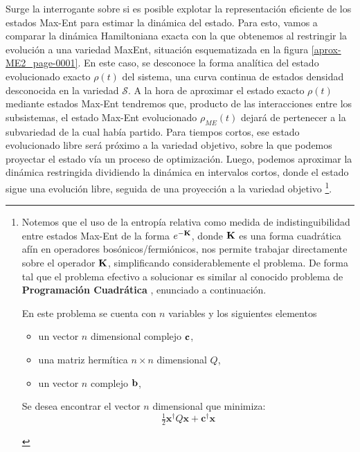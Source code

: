 \documentclass{report} %
\numberwithin{equation}{section}
\begin{document}
Surge la interrogante sobre si es posible explotar la representación eficiente de los estados Max-Ent para estimar la dinámica del estado. Para esto, vamos a comparar  la dinámica Hamiltoniana exacta con la que obtenemos al restringir la evolución a una variedad MaxEnt, situación esquematizada en la figura \ref{aprox-ME2_page-0001}. En este caso, se desconoce la forma analítica del estado evolucionado exacto $\rho(t)$ del sistema, una curva continua de estados densidad desconocida en la variedad $\mathcal{S}$. A la hora de aproximar el estado exacto $\rho(t)$ mediante estados Max-Ent tendremos que, producto de las interacciones entre los subsistemas, el estado Max-Ent evolucionado $\rho_{ME}(t)$  dejará de pertenecer a la subvariedad de la cual había partido. Para tiempos cortos, ese estado evolucionado libre será próximo a la variedad objetivo, sobre la que podemos proyectar el estado vía un proceso de optimización. Luego, podemos aproximar la dinámica restringida dividiendo la dinámica en intervalos cortos, donde el estado sigue una evolución libre, seguida de una proyección a la variedad objetivo \footnote{Notemos que el uso de la entropía relativa como medida de indistinguibilidad entre estados Max-Ent de la forma $e^{-{\bf K} }$, donde ${\bf K}$ es una forma cuadrática afín en operadores bosónicos/fermiónicos, nos permite trabajar directamente sobre el operador ${\bf K}$, simplificando considerablemente el problema. De forma tal que el problema efectivo a solucionar es similar al conocido problema de \textbf{Programación Cuadrática} \cite{NoceWrig06}, enunciado a continuación.  

\begin{tcolorbox}[colback=red!5!white, colframe=red!50!black, title= Problema de Programación Cuadrática Generalizado ]

En este problema se cuenta con $n$ variables y los siguientes elementos

\begin{itemize}
    \item un vector $n$ dimensional complejo ${\bf c}$,
    \item una matriz hermítica $n \times n$ dimensional $Q$,
    \item un vector $n$ complejo ${\bf b}$,
\end{itemize}

Se desea encontrar el vector $n$ dimensional que minimiza: 
$$
{\displaystyle {\tfrac {1}{2}}\mathbf {x} ^{\dagger }Q\mathbf {x} +\mathbf {c} ^{\dagger }\mathbf {x} }
$$
\end{tcolorbox}}.
\end{document}
